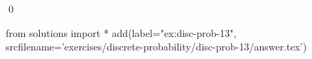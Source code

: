 
\begin{ex} 
  \label{ex:disc-prob-13}
  
  \qed
\end{ex} 
\begin{python0}
from solutions import *
add(label="ex:disc-prob-13",
    srcfilename='exercises/discrete-probability/disc-prob-13/answer.tex') 
\end{python0}
